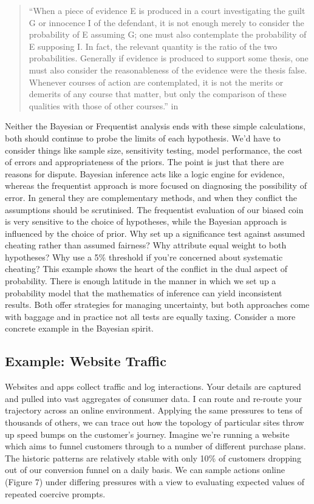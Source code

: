 \documentclass[]{tufte-book}
\theoremstyle{definition}
\theoremstyle{definition}
\theoremstyle{definition}
\theoremstyle{remark}
\begin{document}
\begin{quote}
``When a piece of evidence E is produced in a court investigating the guilt G or innocence I of the defendant, it is not enough merely to consider the probability of E assuming G; one must also contemplate the probability of E supposing I. In fact, the relevant quantity is the ratio of the two probabilities. Generally if evidence is produced to support some thesis, one must also consider the reasonableness of the evidence were the thesis false. Whenever courses of action are contemplated, it is not the merits or demerits of any course that matter, but only the comparison of these qualities with those of other courses.'' in \citep{LindleyTea}
\end{quote}

Neither the Bayesian or Frequentist analysis ends with these simple calculations, both should continue to probe the limits of each hypothesis. We'd have to consider things like sample size, sensitivity testing, model performance, the cost of errors and appropriateness of the priors. The point is just that there are reasons for dispute. Bayesian inference acts like a logic engine for evidence, whereas the frequentist approach is more focused on diagnosing the possibility of error. In general they are complementary methods, and when they conflict the assumptions should be scrutinised. The frequentist evaluation of our biased coin is very sensitive to the choice of hypotheses, while the Bayesian approach is influenced by the choice of prior. Why set up a significance test against assumed cheating rather than assumed fairness? Why attribute equal weight to both hypotheses? Why use a 5\% threshold if you're concerned about systematic cheating? This example shows the heart of the conflict in the dual aspect of probability. There is enough latitude in the manner in which we set up a probability model that the mathematics of inference can yield inconsistent results. Both offer strategies for managing uncertainty, but both approaches come with baggage and in practice not all tests are equally taxing. Consider a more concrete example in the Bayesian spirit.

\hypertarget{example-website-traffic}{%
\subsection{Example: Website Traffic}\label{example-website-traffic}}

Websites and apps collect traffic and log interactions. Your details are captured and pulled into vast aggregates of consumer data. I can route and re-route your trajectory across an online environment. Applying the same pressures to tens of thousands of others, we can trace out how the topology of particular sites throw up speed bumps on the customer's journey. Imagine we're running a website which aims to funnel customers through to a number of different purchase plans. The historic patterns are relatively stable with only 10\% of customers dropping out of our conversion funnel on a daily basis. We can sample actions online (Figure 7) under differing pressures with a view to evaluating expected values of repeated coercive prompts.
\end{document}

